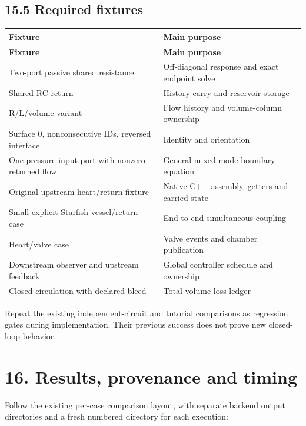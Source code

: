 \documentclass[11pt,a4paper]{article}
\begin{document}
\subsection{15.5 Required fixtures}

\begingroup\footnotesize
\setlength{\tabcolsep}{4pt}
\renewcommand{\arraystretch}{1.17}
\begin{longtable}{>{\raggedright\arraybackslash}p{}>{\raggedright\arraybackslash}p{}}
\toprule
\textbf{Fixture} & \textbf{Main purpose} \\
\midrule
\endfirsthead
\textbf{Fixture} & \textbf{Main purpose} \\
\midrule
\endhead
\bottomrule
\endfoot
Two-port passive shared resistance & Off-diagonal response and exact endpoint solve \\[3pt]
Shared RC return & History carry and reservoir storage \\[3pt]
R/L/volume variant & Flow history and volume-column ownership \\[3pt]
Surface 0, nonconsecutive IDs, reversed interface & Identity and orientation \\[3pt]
One pressure-input port with nonzero returned flow & General mixed-mode boundary equation \\[3pt]
Original upstream heart/return fixture & Native C++ assembly, getters and carried state \\[3pt]
Small explicit Starfish vessel/return case & End-to-end simultaneous coupling \\[3pt]
Heart/valve case & Valve events and chamber publication \\[3pt]
Downstream observer and upstream feedback & Global controller schedule and ownership \\[3pt]
Closed circulation with declared bleed & Total-volume loss ledger \\[3pt]
\end{longtable}
\endgroup
Repeat the existing independent-circuit and tutorial comparisons as regression gates during implementation. Their previous success does not prove new closed-loop behavior.

\section{16. Results, provenance and timing}
Follow the existing per-case comparison layout, with separate backend output directories and a fresh numbered directory for each execution:
\end{document}
